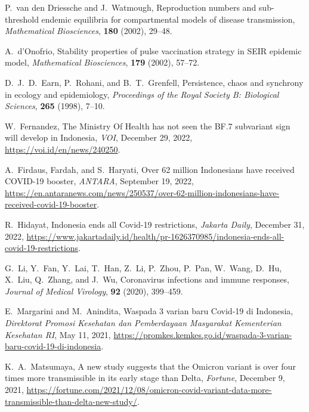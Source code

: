 \documentclass[11pt,reqno]{amsart}
\begin{document}
\begin{thebibliography}{99}
     P.\ van den Driessche and J.\ Watmough,
     \newblock Reproduction numbers and sub-threshold endemic equilibria for compartmental models of disease transmission,
     \newblock \emph{Mathematical Biosciences}, \textbf{180} (2002), 29--48.

     A.\ d'Onofrio,
     \newblock Stability properties of pulse vaccination strategy in SEIR epidemic model,
     \newblock \emph{Mathematical Biosciences}, \textbf{179} (2002), 57--72.

     D.\ J.\ D.\ Earn, P.\ Rohani, and B.\ T.\ Grenfell,
     \newblock Persistence, chaos and synchrony in ecology and epidemiology,
     \newblock \emph{Proceedings of the Royal Society B: Biological Sciences}, \textbf{265} (1998), 7--10.

     W.\ Fernandez,
     \newblock The Ministry Of Health has not seen the BF.7 subvariant sign will develop in Indonesia,
     \newblock \emph{VOI}, December 29, 2022, \ul{https://voi.id/en/news/240250}.

     A.\ Firdaus, Fardah, and S.\ Haryati,
     \newblock Over 62 million Indonesians have received COVID-19 booster,
     \newblock \emph{ANTARA}, September 19, 2022, \ul{https://en.antaranews.com/news/250537/over-62-million-indonesians-have-received-covid-19-booster}.

     R.\ Hidayat,
     \newblock Indonesia ends all Covid-19 restrictions,
     \newblock \emph{Jakarta Daily}, December 31, 2022, \ul{https://www.jakartadaily.id/health/pr-1626370985/indonesia-ends-all-covid-19-restrictions}.

     \newblock G.\ Li, Y.\ Fan, Y.\ Lai, T.\ Han, Z.\ Li, P.\ Zhou, P.\ Pan, W.\ Wang, D.\ Hu, X.\ Liu, Q.\ Zhang, and J.\ Wu,
     \newblock Coronavirus infections and immune responses,
     \newblock \emph{Journal of Medical Virology}, \textbf{92} (2020), 399--459.

     E.\ Margarini and M.\ Anindita,
     \newblock Waspada 3 varian baru Covid-19 di Indonesia,
     \newblock \emph{Direktorat Promosi Kesehatan dan Pemberdayaan Masyarakat Kementerian Kesehatan RI}, May 11, 2021, \ul{https://promkes.kemkes.go.id/waspada-3-varian-baru-covid-19-di-indonesia}.

     K.\ A.\ Matsumaya,
     \newblock A new study suggests that the Omicron variant is over four times more transmissible in its early stage than Delta,
     \newblock \emph{Fortune}, December 9, 2021, \ul{https://fortune.com/2021/12/08/omicron-covid-variant-data-more-transmissible-than-delta-new-study/}.


\end{thebibliography}
\end{document}
